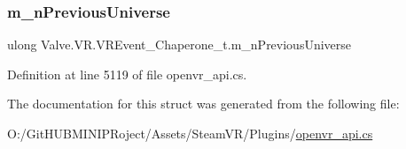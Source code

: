 \mbox{\label{struct_valve_1_1_v_r_1_1_v_r_event___chaperone__t_a4bd240b1983fade1caca0bc9757ae2db}} 
\subsubsection{\texorpdfstring{m\_nPreviousUniverse}{m\_nPreviousUniverse}}
{\footnotesize\ttfamily ulong Valve.\+V\+R.\+V\+R\+Event\+\_\+\+Chaperone\+\_\+t.\+m\+\_\+n\+Previous\+Universe}



Definition at line 5119 of file openvr\+\_\+api.\+cs.



The documentation for this struct was generated from the following file\+:\begin{DoxyCompactItemize}
\item 
O\+:/\+Git\+H\+U\+B\+M\+I\+N\+I\+P\+Roject/\+Assets/\+Steam\+V\+R/\+Plugins/\mbox{\hyperlink{openvr__api_8cs}{openvr\+\_\+api.\+cs}}\end{DoxyCompactItemize}
